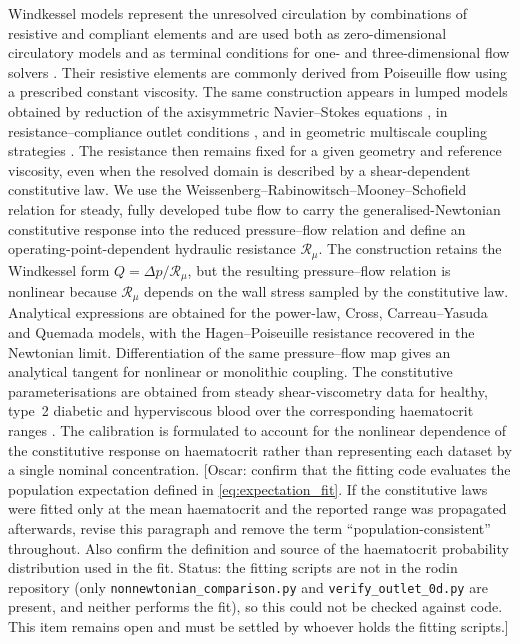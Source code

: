 \documentclass[lineno]{jfm}
\begin{document}
Windkessel models represent the unresolved circulation by combinations of
resistive and compliant elements
\citep{frank1990basic,westerhof2009arterial} and are used both as
zero-dimensional circulatory models and as terminal conditions for one- and
three-dimensional flow solvers
\citep{bessems2007wave,mei2018fluid,westerhof2009arterial}. Their resistive
elements are commonly derived from Poiseuille flow using a prescribed constant
viscosity. The same construction appears in lumped models obtained by
reduction of the axisymmetric Navier--Stokes equations
\citep{olufsen2003deriving}, in resistance--compliance outlet conditions
\citep{vignon2006outflow,kim2010patient}, and in geometric multiscale coupling
strategies \citep{quarteroni2016geometric}. The resistance then remains fixed
for a given geometry and reference viscosity, even when the resolved domain is
described by a shear-dependent constitutive law.
We use the Weissenberg--Rabinowitsch--Mooney--Schofield relation for steady,
fully developed tube flow to carry the generalised-Newtonian constitutive
response into the reduced pressure--flow relation and define an
operating-point-dependent hydraulic resistance
$\mathcal{R}_{\mu}$. The construction retains the Windkessel form
$Q=\Delta p/\mathcal{R}_{\mu}$, but the resulting pressure--flow relation is
nonlinear because $\mathcal{R}_{\mu}$ depends on the wall stress sampled by
the constitutive law. Analytical expressions are obtained for the power-law,
Cross, Carreau--Yasuda and Quemada models, with the Hagen--Poiseuille
resistance recovered in the Newtonian limit. Differentiation of the same
pressure--flow map gives an analytical tangent for nonlinear or monolithic
coupling.
The constitutive parameterisations are obtained from steady shear-viscometry
data for healthy, type~2 diabetic and hyperviscous blood over the corresponding
haematocrit ranges
\citep{Quemada1977,Popel2005,cho2008hemorheological,Sun2022,Chien1966}.
The calibration is formulated to account for the nonlinear dependence of the
constitutive response on haematocrit rather than representing each dataset by
a single nominal concentration.
{\color{red}[Oscar: confirm that the fitting code evaluates the population
expectation defined in \eqref{eq:expectation_fit}. If the constitutive laws
were fitted only at the mean haematocrit and the reported range was propagated
afterwards, revise this paragraph and remove the term
``population-consistent'' throughout. Also confirm the definition and source
of the haematocrit probability distribution used in the fit.
{\color{blue}Status: the fitting scripts are not in the rodin repository
(only \texttt{nonnewtonian\_comparison.py} and \texttt{verify\_outlet\_0d.py}
are present, and neither performs the fit), so this could not be checked
against code. This item remains open and must be settled by whoever holds the
fitting scripts.}]}
\end{document}
